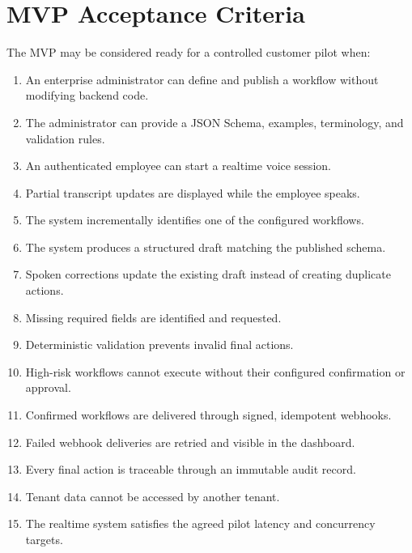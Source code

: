 \documentclass[11pt,a4paper]{article}
\begin{document}
\section{MVP Acceptance Criteria}

The MVP may be considered ready for a controlled customer pilot when:

\begin{enumerate}
\item An enterprise administrator can define and publish a workflow
without modifying backend code.

\item The administrator can provide a JSON Schema, examples,
terminology, and validation rules.

\item An authenticated employee can start a realtime voice session.

\item Partial transcript updates are displayed while the employee speaks.

\item The system incrementally identifies one of the configured workflows.

\item The system produces a structured draft matching the published schema.

\item Spoken corrections update the existing draft instead of creating
duplicate actions.

\item Missing required fields are identified and requested.

\item Deterministic validation prevents invalid final actions.

\item High-risk workflows cannot execute without their configured
confirmation or approval.

\item Confirmed workflows are delivered through signed, idempotent
webhooks.

\item Failed webhook deliveries are retried and visible in the dashboard.

\item Every final action is traceable through an immutable audit record.

\item Tenant data cannot be accessed by another tenant.

\item The realtime system satisfies the agreed pilot latency and
concurrency targets.
\end{enumerate}
\end{document}

